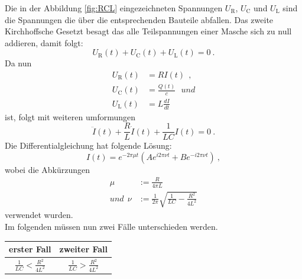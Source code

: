 Die in der Abbildung \ref{fig:RCL} eingezeichneten Spannungen $U_\text{R}$, $U_\text{C}$ und $U_\text{L}$ sind die Spannungen die über die entsprechenden Bauteile abfallen. Das zweite Kirchhoffsche Gesetzt besagt das alle Teilspannungen einer Masche sich zu null addieren, damit folgt:
\begin{equation}
	U_\text{R}(t) + U_\text{C}(t) + U_\text{L}(t) = 0 \ .
\end{equation}
Da nun
\begin{align*}
	U_\text{R}(t) &= R I(t) \ \ , \\
	U_\text{C}(t) &= \frac{Q(t)}{c} \ \ \ und \\
	U_\text{L}(t) &= L \frac{d I}{d t}
\end{align*}
ist, folgt mit weiteren umformungen
\begin{equation}
	\ddot{I}(t) + \frac{R}{L} \dot{I}(t) + \frac{1}{LC} I(t) = 0 \ .
\end{equation}
Die Differentialgleichung hat folgende Lösung:
\begin{equation}
	I(t) = e^{-2 \pi \mu t} \left(A e^{i2 \pi \nu t} + B e^{-i2 \pi \nu t} \right) \ ,
	\label{eqn:I}
\end{equation}
wobei die Abkürzungen
\begin{align*}
	\mu & := \frac{R}{4 \pi L} \\
	und \ \ \nu & := \frac{1}{2 \pi} \sqrt{\frac{1}{LC} - \frac{R^2}{4L^2}}
\end{align*}
verwendet wurden. \\
Im folgenden müssen nun zwei Fälle unterschieden werden.

\begin{table}
	\centering
	\begin{tabular}{c | c}
		erster Fall & zweiter Fall \\
		\midrule
		$\frac{1}{LC} < \frac{R^2}{4L^2}$ & $\frac{1}{LC} > \frac{R^2}{4L^2}$ \\
	\end{tabular}
\end{table}

